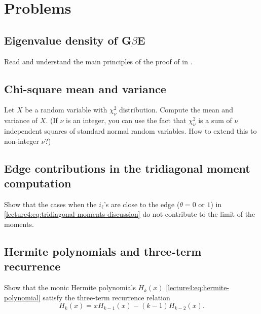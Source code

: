 \documentclass[letterpaper,11pt,oneside,reqno]{book}
\numberwithin{equation}{chapter}  %
\theoremstyle{definition}
\begin{document}
\section{Problems}

\subsection{Eigenvalue density of G$\beta$E}

Read and understand the main principles of the
proof of 
in \cite{dumitriu2002matrix}.

\subsection{Chi-square mean and variance}

Let $X$ be a random variable with $\chi^2_\nu$ distribution. Compute the mean and variance of $X$.
(If $\nu$ is an integer, you can use the fact that $\chi^2_\nu$ is a sum of $\nu$ independent squares of standard normal random variables.
How to extend this to non-integer \(\nu\)?)

\subsection{Edge contributions in the tridiagonal moment computation}
\label{lecture4:prob:edges-in-tridiagonal}

Show that the cases when the $i_{\ell}$'s are close to the edge ($\theta=0$ or $1$)
in \eqref{lecture4:eq:tridiagonal-moments-discussion}
do not contribute to the limit of the moments.

\subsection{Hermite polynomials and three-term recurrence}
\label{lecture4:prob:Hermite-3-term}

Show that the monic Hermite polynomials $H_k(x)$
\eqref{lecture4:eq:hermite-polynomial}
satisfy the three-term recurrence relation
\begin{equation*}
	\label{lecture4:eq:hermite-3-term}
	H_k(x) = x H_{k-1}(x) - (k-1) H_{k-2}(x).
\end{equation*}

\subsection{}
\label{lecture4:prob:Vandermonde-determinant}
\end{document}

